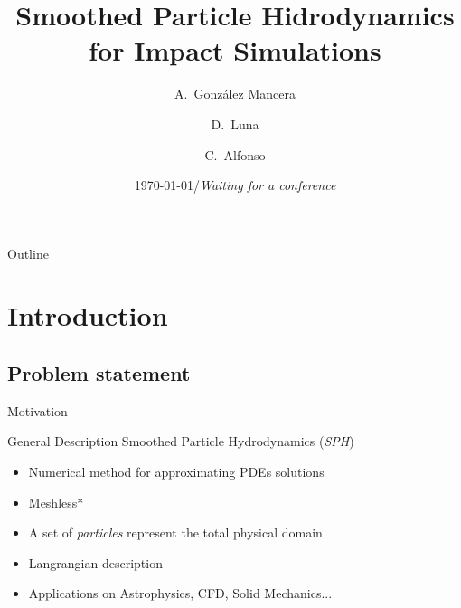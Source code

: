 \documentclass[10pt]{beamer}
\title[Smoothed Particle Hidrodynamics]
{Smoothed Particle Hidrodynamics for Impact Simulations}
\author[A. González-Mancera et al.] %
{A.~González Mancera\inst{1} \and D.~Luna\inst{1} \and C.~Alfonso\inst{1}}
\institute[Universidad de los Andes] %
{
  \inst{1}%
  Department of Mechanical Engineering\\
  Universidad de los Andes
}
\date[APS - DFD 2015] %
{\today/\textit{Waiting for a conference}}
\begin{document}
\begin{frame}
  \titlepage
\end{frame}

 \begin{frame}{Outline}
   \tableofcontents
 \end{frame}




\section{Introduction}

\subsection{Problem statement}


  
\begin{frame}{Motivation}

\end{frame}

\begin{frame}{General Description}
Smoothed Particle Hydrodynamics (\textit{SPH})
\begin{itemize}
\item Numerical method for approximating PDEs solutions
\item Meshless*
\item A set of \textit{particles} represent the total physical domain
\item Langrangian description
\item Applications on Astrophysics, CFD, Solid Mechanics...
\end{itemize}
\end{frame}
\end{document}

